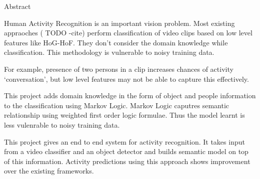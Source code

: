 \begin{center}
\LARGE{Abstract}
\end{center}

\vspace{0.5in}

Human Activity Recognition is an important vision problem. 
Most existing appraoches ( TODO -cite) perform classification of video clips 
based on low level features like HoG-HoF. They don't consider the domain knowledge while classification.
This methodology is vulnerable to noisy training data.

For example, presence of two persons in a clip increases chances of activity `conversation',
but low level features may not be able to capture this effectively.

This project adds domain knowledge in the form of object and people information
to the classification using Markov Logic. Markov Logic caputres semantic relationship
using weighted first order logic formulae. Thus the model learnt is less vulenrable to noisy
training data.

This project gives an end to end system for activity recognition. It takes input from 
a video classifier and an object detector and builds semantic model on top of this information.
Activity predictions using this approach shows improvement over the existing frameworks.
